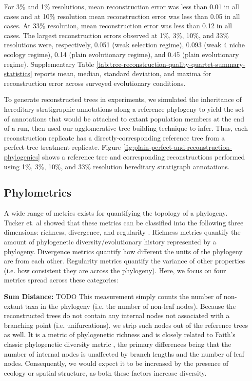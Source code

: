 For 3\% and 1\% resolutions, mean reconstruction error was less than 0.01 in all cases and at 10\% resolution mean reconstruction error was less than 0.05 in all cases.
At 33\% resolution, mean reconstruction error was less than 0.12 in all cases.
The largest reconstruction errors observed at 1\%, 3\%, 10\%, and 33\% resolutions were, respectively, 0.051 (weak selection regime), 0.093 (weak 4 niche ecology regime), 0.14 (plain evolutionary regime), and 0.45 (plain evolutionary regime).
Supplementary Table \ref{tab:tree-reconstruction-quality-quartet-summary-statistics} reports mean, median, standard deviation, and maxima for reconstruction error across surveyed evolutionary conditions.

To generate reconstructed trees in experiments, we simulated the inheritance of hereditary stratigraphic annotations along a reference phylogeny to yield the set of annotations that would be attached to extant population members at the end of a run, then used our agglomerative tree building technique to infer.
Thus, each reconstruction replicate has a directly-corresponding reference tree from a perfect-tree treatment replicate.
Figure \ref{fig:plain-perfect-and-reconstruction-phylogenies} shows a reference tree and corresponding reconstructions performed using 1\%, 3\%, 10\%, and 33\% resolution hereditary stratigraph annotations.

\subsection{Phylometrics}

A wide range of metrics exists for quantifying the topology of a phylogeny.
Tucker et.
al showed that these metrics can be classified into the following three dimensions: richness, divergence, and regularity \citep{tuckerGuidePhylogeneticMetrics2017}.
Richness metrics quantify the amount of phylogenetic diversity/evolutionary history represented by a phylogeny.
Divergence metrics quantify how different the units of the phylogeny are from each other.
Regularity metrics quantify the variance of other properties (i.e. how consistent they are across the phylogeny).
Here, we focus on four metrics spread across these categories:

\textbf{Sum Distance:} TODO
This measurement simply counts the number of non-extant taxa in the phylogeny (i.e. the number of non-leaf nodes).
Because the reconstructed trees do not contain any internal nodes not associated with a branching point (i.e. unifurcations), we strip such nodes out of the reference trees as well.
It is a metric of phylogenetic richness and is closely related to Faith's classic phylogenetic diversity metric \citep{faithConservationEvaluationPhylogenetic1992}, the primary differences being that the number of internal nodes is unaffected by branch lengths and the number of leaf nodes.
Consequently, we would expect it to be increased by the presence of ecology or spatial structure, as both these factors increase diversity.

